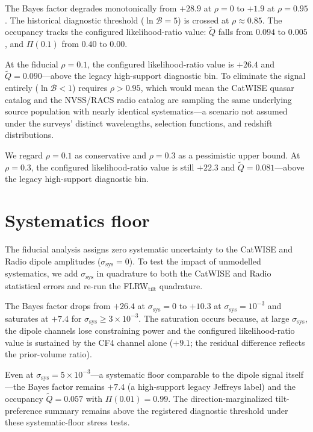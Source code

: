The Bayes factor degrades monotonically from $+28.9$ at $\rho = 0$
to $+1.9$ at $\rho = 0.95$.  The historical diagnostic threshold
($\ln\mathcal{B} = 5$) is crossed at $\rho \approx 0.85$.
The occupancy tracks the configured likelihood-ratio value: $\tilde{Q}$ falls from
$0.094$ to $0.005$, and $\Pi(0.1)$ from $0.40$ to $0.00$.

At the fiducial $\rho = 0.1$, the configured likelihood-ratio value is $+26.4$ and
$\tilde{Q} = 0.090$---above the legacy high-support diagnostic
bin.  To
eliminate the signal entirely ($\ln\mathcal{B} < 1$) requires
$\rho > 0.95$, which would mean the CatWISE quasar catalog and
the NVSS/RACS radio catalog are sampling the same underlying
source population with nearly identical systematics---a
scenario not assumed under the surveys' distinct wavelengths,
selection functions, and redshift distributions.

We regard $\rho = 0.1$ as conservative and $\rho = 0.3$ as
a pessimistic upper bound.  At $\rho = 0.3$, the configured likelihood-ratio value is
still $+22.3$ and $\tilde{Q} = 0.081$---above the legacy
high-support diagnostic bin.


\section{Systematics floor}\label{sec:sys-floor}

The fiducial analysis assigns zero systematic uncertainty to
the CatWISE and Radio dipole amplitudes ($\sigma_{\mathrm{sys}} = 0$).
To test the impact of unmodelled systematics, we add
$\sigma_{\mathrm{sys}}$ in quadrature to both the CatWISE and
Radio statistical errors and re-run the FLRW$_\mathrm{tilt}$
quadrature.

The Bayes factor drops from $+26.4$ at $\sigma_{\mathrm{sys}} = 0$
to $+10.3$ at $\sigma_{\mathrm{sys}} = 10^{-3}$ and saturates at
$+7.4$ for $\sigma_{\mathrm{sys}} \geq 3 \times 10^{-3}$.  The
saturation occurs because, at large $\sigma_{\mathrm{sys}}$, the
dipole channels lose constraining power and the configured likelihood-ratio value is
sustained by the CF4 channel alone ($+9.1$; the residual
difference reflects the prior-volume ratio).

Even at $\sigma_{\mathrm{sys}} = 5 \times 10^{-3}$---a systematic
floor comparable to the dipole signal itself---the Bayes factor
remains $+7.4$ (a high-support legacy Jeffreys label) and the
occupancy $\tilde{Q} = 0.057$ with $\Pi(0.01) = 0.99$.
The direction-marginalized tilt-preference summary remains above
the registered diagnostic threshold under these systematic-floor
stress tests.


